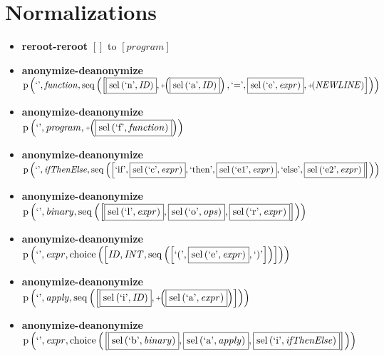 \section{Normalizations}
{\footnotesize\begin{itemize}
\item \textbf{reroot-reroot} $\left[\right]$ to $\left[\mathit{program}\right]$
\item \textbf{anonymize-deanonymize}\\$\mathrm{p}\left(\text{`'},\mathit{function},\mathrm{seq}\left(\left[\fbox{$\mathrm{sel}\left(\text{`n'},\mathit{ID}\right)$}, \plus \left(\fbox{$\mathrm{sel}\left(\text{`a'},\mathit{ID}\right)$}\right), \text{`='}, \fbox{$\mathrm{sel}\left(\text{`e'},\mathit{expr}\right)$}, \plus \left(\mathit{NEWLINE}\right)\right]\right)\right)$
\item \textbf{anonymize-deanonymize}\\$\mathrm{p}\left(\text{`'},\mathit{program},\plus \left(\fbox{$\mathrm{sel}\left(\text{`f'},\mathit{function}\right)$}\right)\right)$
\item \textbf{anonymize-deanonymize}\\$\mathrm{p}\left(\text{`'},\mathit{ifThenElse},\mathrm{seq}\left(\left[\text{`if'}, \fbox{$\mathrm{sel}\left(\text{`c'},\mathit{expr}\right)$}, \text{`then'}, \fbox{$\mathrm{sel}\left(\text{`e1'},\mathit{expr}\right)$}, \text{`else'}, \fbox{$\mathrm{sel}\left(\text{`e2'},\mathit{expr}\right)$}\right]\right)\right)$
\item \textbf{anonymize-deanonymize}\\$\mathrm{p}\left(\text{`'},\mathit{binary},\mathrm{seq}\left(\left[\fbox{$\mathrm{sel}\left(\text{`l'},\mathit{expr}\right)$}, \fbox{$\mathrm{sel}\left(\text{`o'},\mathit{ops}\right)$}, \fbox{$\mathrm{sel}\left(\text{`r'},\mathit{expr}\right)$}\right]\right)\right)$
\item \textbf{anonymize-deanonymize}\\$\mathrm{p}\left(\text{`'},\mathit{expr},\mathrm{choice}\left(\left[\mathit{ID}, \mathit{INT}, \mathrm{seq}\left(\left[\text{`('}, \fbox{$\mathrm{sel}\left(\text{`e'},\mathit{expr}\right)$}, \text{`)'}\right]\right)\right]\right)\right)$
\item \textbf{anonymize-deanonymize}\\$\mathrm{p}\left(\text{`'},\mathit{apply},\mathrm{seq}\left(\left[\fbox{$\mathrm{sel}\left(\text{`i'},\mathit{ID}\right)$}, \plus \left(\fbox{$\mathrm{sel}\left(\text{`a'},\mathit{expr}\right)$}\right)\right]\right)\right)$
\item \textbf{anonymize-deanonymize}\\$\mathrm{p}\left(\text{`'},\mathit{expr},\mathrm{choice}\left(\left[\fbox{$\mathrm{sel}\left(\text{`b'},\mathit{binary}\right)$}, \fbox{$\mathrm{sel}\left(\text{`a'},\mathit{apply}\right)$}, \fbox{$\mathrm{sel}\left(\text{`i'},\mathit{ifThenElse}\right)$}\right]\right)\right)$

\end{itemize}}
